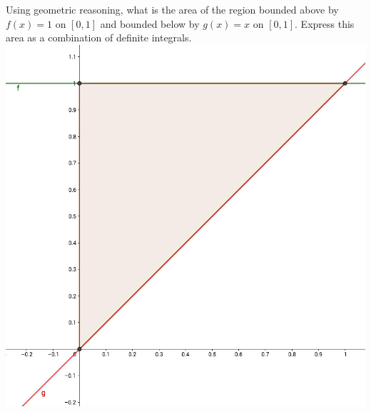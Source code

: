 \documentclass[12pt, a4paper]{article}
\begin{document}
\begin{ex}
  Using geometric reasoning, what is the area of the region bounded
  above by \(f(x) = 1\) on \([0,1]\) and bounded below by \(g(x) = x\)
  on \([0,1]\). Express this area as a combination of definite integrals.
  \\
  \includegraphics[scale=0.3]{images/region-1}
\end{ex}
\end{document}
